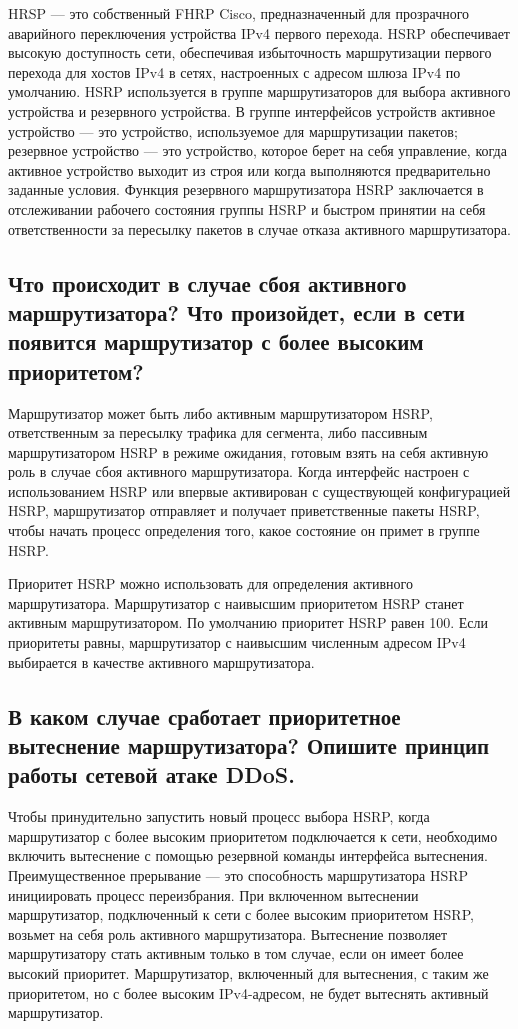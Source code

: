 HRSP — это собственный FHRP Cisco, предназначенный для прозрачного аварийного переключения устройства IPv4 первого перехода. HSRP обеспечивает высокую доступность сети, обеспечивая избыточность маршрутизации первого перехода для хостов IPv4 в сетях, настроенных с адресом шлюза IPv4 по умолчанию. HSRP используется в группе маршрутизаторов для выбора активного устройства и резервного устройства. В группе интерфейсов устройств активное устройство — это устройство, используемое для маршрутизации пакетов; резервное устройство — это устройство, которое берет на себя управление, когда активное устройство выходит из строя или когда выполняются предварительно заданные условия. Функция резервного маршрутизатора HSRP заключается в отслеживании рабочего состояния группы HSRP и быстром принятии на себя ответственности за пересылку пакетов в случае отказа активного маршрутизатора.


\subsection{Что происходит в случае сбоя активного маршрутизатора? Что произойдет, если в сети появится маршрутизатор
с более высоким приоритетом?}

Маршрутизатор может быть либо активным маршрутизатором HSRP, ответственным за пересылку трафика для сегмента, либо пассивным маршрутизатором HSRP в режиме ожидания, готовым взять на себя активную роль в случае сбоя активного маршрутизатора. Когда интерфейс настроен с использованием HSRP или впервые активирован с существующей конфигурацией HSRP, маршрутизатор отправляет и получает приветственные пакеты HSRP, чтобы начать процесс определения того, какое состояние он примет в группе HSRP.

Приоритет HSRP можно использовать для определения активного маршрутизатора. Маршрутизатор с наивысшим приоритетом HSRP станет активным маршрутизатором. По умолчанию приоритет HSRP равен 100. Если приоритеты равны, маршрутизатор с наивысшим численным адресом IPv4 выбирается в качестве активного маршрутизатора.

\subsection{В каком случае сработает приоритетное вытеснение маршрутизатора? Опишите принцип работы сетевой атаке DDoS.}

Чтобы принудительно запустить новый процесс выбора HSRP, когда маршрутизатор с более высоким приоритетом подключается к сети, необходимо включить вытеснение с помощью резервной команды интерфейса вытеснения. Преимущественное прерывание — это способность маршрутизатора HSRP инициировать процесс переизбрания. При включенном вытеснении маршрутизатор, подключенный к сети с более высоким приоритетом HSRP, возьмет на себя роль активного маршрутизатора.
Вытеснение позволяет маршрутизатору стать активным только в том случае, если он имеет более высокий приоритет. Маршрутизатор, включенный для вытеснения, с таким же приоритетом, но с более высоким IPv4-адресом, не будет вытеснять активный маршрутизатор.

